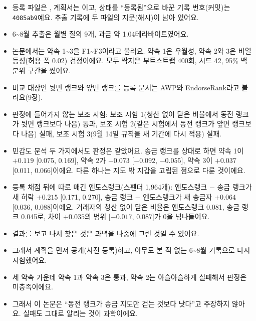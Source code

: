 \begin{deeper}[진짜 이름과 숫자]
\begin{itemize}
\item 등록 파일은 , 계획서는 이고, 상태를 “등록됨”으로 바꾼 기록 번호(커밋)는 \texttt{4085ab9}예요. 추출 기록에 두 파일의 지문(해시)이 남아 있어요.
\item 6\textasciitilde{}8월 추출은 월별 질의 9개, 과금 약 1.04테라바이트였어요.
\item 논문에서는 약속 1\textasciitilde{}3을 F1\textasciitilde{}F3이라고 불러요. 약속 1은 우월성, 약속 2와 3은 비열등성(허용 폭 0.02) 검정이에요. 모두 짝지은 부트스트랩 400회, 시드 42, 95\% 백분위 구간을 썼어요.
\item 비교 대상인 뒷면 랭크와 앞면 랭크를 등록 문서는 AWP와 EndorseRank라고 불러요(9장).
\item 판정에 들어가지 않는 보조 시험: 보조 시험 1(청산 없이 닫은 비율에서 동전 랭크가 뒷면 랭크보다 나음) 통과, 보조 시험 2(같은 시험에서 동전 랭크가 앞면 랭크보다 나음) 실패, 보조 시험 3(9월 14일 규칙을 새 기간에 다시 적용) 실패.
\item 민감도 분석 두 가지에서도 판정은 같았어요. 송금 랭크를 상대로 하면 약속 1이 $+0.119$ [0.075, 0.169], 약속 2가 $-0.073$ [$-0.092$, $-0.055$], 약속 3이 $+0.037$ [0.011, 0.066]이에요. 다른 하나는 지도 밖 지갑을 고립된 점으로 다룬 것이에요.
\item 등록 채점 뒤에 따로 매긴 엔도스랭크(스펜더 1,964개): 엔도스랭크 $-$ 송금 랭크가 새 허락 $+0.215$ [0.171, 0.270], 송금 랭크 $-$ 엔도스랭크가 새 송금자 $+0.064$ [0.036, 0.088]이에요. 거래자의 청산 없이 닫은 비율은 엔도스랭크 0.081, 송금 랭크 0.045로, 차이 $+0.035$의 범위 [$-0.017$, 0.087]가 0을 넘나들어요.
\end{itemize}
\end{deeper}

\begin{learned}
\begin{itemize}
\item 결과를 보고 나서 찾은 것은 과녁을 나중에 그린 것일 수 있어요.
\item 그래서 계획을 먼저 공개(사전 등록)하고, 아무도 본 적 없는 6\textasciitilde{}8월 기록으로 다시 시험했어요.
\item 세 약속 가운데 약속 1과 약속 3은 통과, 약속 2는 아슬아슬하게 실패해서 판정은 미충족이에요.
\item 그래서 이 논문은 “동전 랭크가 송금 지도만 걷는 것보다 낫다”고 주장하지 않아요. 실패도 그대로 알리는 것이 과학이에요.
\end{itemize}
\end{learned}

